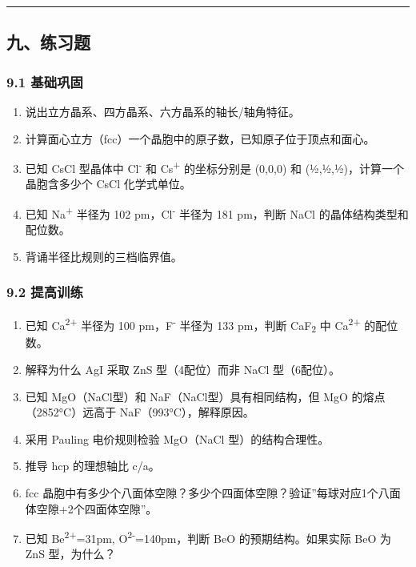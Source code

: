 \begin{center}\rule{0.5\linewidth}{0.5pt}\end{center}

\subsection{九、练习题}\label{ux4e5dux7ec3ux4e60ux9898}

\subsubsection{9.1 基础巩固}\label{ux57faux7840ux5de9ux56fa}

\begin{enumerate}
\def\labelenumi{\arabic{enumi}.}
\tightlist
\item
  说出立方晶系、四方晶系、六方晶系的轴长/轴角特征。
\item
  计算面心立方（fcc）一个晶胞中的原子数，已知原子位于顶点和面心。
\item
  已知 CsCl 型晶体中 Cl\textsuperscript{-} 和 Cs\textsuperscript{+} 的坐标分别是 (0,0,0) 和 (½,½,½)，计算一个晶胞含多少个 CsCl 化学式单位。
\item
  已知 Na\textsuperscript{+} 半径为 102 pm，Cl\textsuperscript{-} 半径为 181 pm，判断 NaCl 的晶体结构类型和配位数。
\item
  背诵半径比规则的三档临界值。
\end{enumerate}

\subsubsection{9.2 提高训练}\label{ux63d0ux9ad8ux8badux7ec3}

\begin{enumerate}
\def\labelenumi{\arabic{enumi}.}
\setcounter{enumi}{5}
\tightlist
\item
  已知 Ca\textsuperscript{2+} 半径为 100 pm，F\textsuperscript{-} 半径为 133 pm，判断 CaF\textsubscript{2} 中 Ca\textsuperscript{2+} 的配位数。
\item
  解释为什么 AgI 采取 ZnS 型（4配位）而非 NaCl 型（6配位）。
\item
  已知 MgO（NaCl型）和 NaF（NaCl型）具有相同结构，但 MgO 的熔点（2852°C）远高于 NaF（993°C），解释原因。
\item
  采用 Pauling 电价规则检验 MgO（NaCl 型）的结构合理性。
\item
  推导 hcp 的理想轴比 c/a。
\item
  fcc 晶胞中有多少个八面体空隙？多少个四面体空隙？验证''每球对应1个八面体空隙+2个四面体空隙''。
\item
  已知 Be\textsuperscript{2+}=31pm, O\textsuperscript{2-}=140pm，判断 BeO 的预期结构。如果实际 BeO 为 ZnS 型，为什么？
\end{enumerate}


